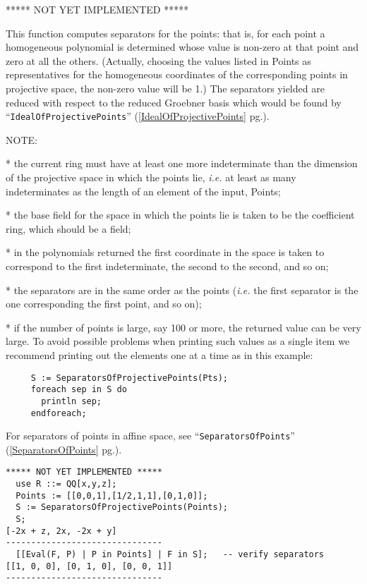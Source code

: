 \documentclass[a4paper]{mybook}
\newenvironment{command}{}{} %
\begin{document}
\begin{command}
***** NOT YET IMPLEMENTED *****
\par 
This function computes separators for the points: that is, for each
point a homogeneous polynomial is determined whose value is non-zero at
that point and zero at all the others.  (Actually, choosing the values
listed in Points as representatives for the homogeneous coordinates of
the corresponding points in projective space, the non-zero value will
be 1.)  The separators yielded are reduced with respect to the reduced
Groebner basis which would be found by ``\verb&IdealOfProjectivePoints&'' (\ref{IdealOfProjectivePoints} pg.\pageref{IdealOfProjectivePoints}).
\par 
NOTE:
\par 
 * the current ring must have at least one more indeterminate than the
   dimension of the projective space in which the points lie, \textit{i.e.} at
   least as many indeterminates as the length of an element of
   the input, Points;
\par 
 * the base field for the space in which the points lie is taken to be
   the coefficient ring, which should be a field;
\par 
 * in the polynomials returned the first coordinate in the space is
   taken to correspond to the first indeterminate, the second to the
   second, and so on;
\par 
 * the separators are in the same order as the points (\textit{i.e.} the first
   separator is the one corresponding the first point, and so on);
\par 
 * if the number of points is large, say 100 or more, the returned
   value can be very large.  To avoid possible problems when printing
   such values as a single item we recommend printing out the elements
   one at a time as in this example:
\begin{verbatim}
     S := SeparatorsOfProjectivePoints(Pts);
     foreach sep in S do
       println sep;
     endforeach;
\end{verbatim}
For separators of points in affine space, see
``\verb&SeparatorsOfPoints&'' (\ref{SeparatorsOfPoints} pg.\pageref{SeparatorsOfPoints}).
\begin{Verbatim}[label=example, rulecolor=\color{PineGreen}, frame=single]
***** NOT YET IMPLEMENTED *****
  use R ::= QQ[x,y,z];
  Points := [[0,0,1],[1/2,1,1],[0,1,0]];
  S := SeparatorsOfProjectivePoints(Points);
  S;
[-2x + z, 2x, -2x + y]
-------------------------------
  [[Eval(F, P) | P in Points] | F in S];   -- verify separators
[[1, 0, 0], [0, 1, 0], [0, 0, 1]]
-------------------------------
\end{Verbatim}



\end{command}
\end{document}
